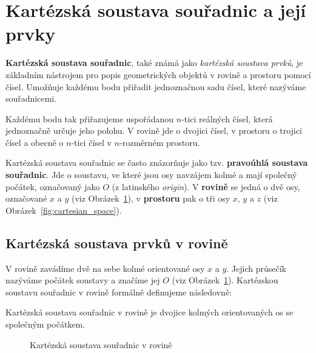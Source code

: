 \section{Kartézská soustava souřadnic a její prvky}\label{sec:Cartesian_coordinate_system}

\textbf{Kartézská soustava souřadnic}, také známá jako \emph{kartézská soustava prvků},
je základním nástrojem pro popis geometrických objektů v rovině a prostoru pomocí čísel.
Umožňuje každému bodu přiřadit jednoznačnou sadu čísel, které nazýváme souřadnicemi.

Každému bodu tak přiřazujeme uspořádanou $n$-tici reálných čísel, která jednoznačně určuje jeho polohu.
V rovině jde o dvojici čísel, v prostoru o trojici čísel a obecně o $n$-tici čísel v $n$-rozměrném prostoru.

Kartézská soustava souřadnic se často znázorňuje jako tzv. \textbf{pravoúhlá soustava souřadnic}.
Jde o soustavu, ve které jsou osy navzájem kolmé a mají společný počátek,
označovaný jako $O$ (z latinského \emph{origin}).
V \textbf{rovině} se jedná o dvě osy, označované $x$ a $y$ (viz Obrázek~\ref{fig:cartesian_plane}),
v \textbf{prostoru} pak o tři osy $x$, $y$ a $z$ (viz Obrázek~\ref{fig:cartesian_space}).



\subsection{Kartézská soustava prvků v rovině}\label{subsec:Cartesian_coordinate_system_plane}
V rovině zavádíme dvě na sebe kolmé orientované osy $x$ a $y$.
Jejich průsečík nazýváme počátek soustavy a značíme jej $O$ (viz Obrázek~\ref{fig:cartesian_plane}).
Kartézskou soustavu souřadnic v rovině formálně definujeme následovně:

\begin{definition}\label{def:karteska_soustava}
    Kartézská soustava souřadnic v rovině je dvojice kolmých orientovaných os se společným počátkem.
\end{definition}

\begin{figure}[H]
    \centering
    \caption{Kartézská soustava souřadnic v rovině}
    \label{fig:cartesian_plane}
\end{figure}


